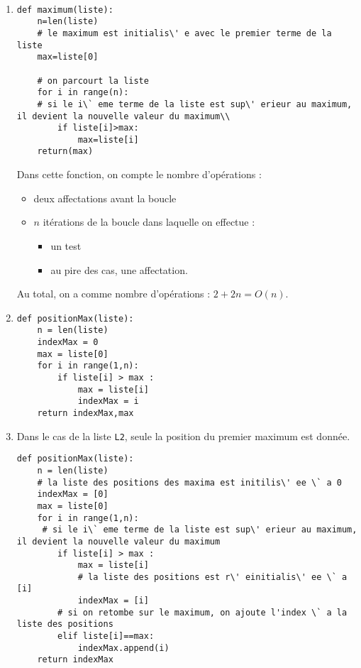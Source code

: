 \begin{solution}~\\
\vspace{-0.7cm}
\begin{enumerate}
\item 
\begin{verbatim}
def maximum(liste):
    n=len(liste)
    # le maximum est initialis\' e avec le premier terme de la liste
    max=liste[0]
    
    # on parcourt la liste
    for i in range(n):
    # si le i\` eme terme de la liste est sup\' erieur au maximum, il devient la nouvelle valeur du maximum\\
        if liste[i]>max:
            max=liste[i]
    return(max)                    
\end{verbatim}


Dans cette fonction, on compte le nombre d'op\' erations :

\begin{itemize}
\item deux affectations avant la boucle
\item $n$ it\' erations de la boucle dans laquelle on effectue :
\begin{itemize}
\item un test
\item au pire des cas, une affectation.
\end{itemize}
\end{itemize}
Au total, on a comme nombre d'op\' erations : $2+2n=O(n)$.\\
\item 
\begin{verbatim}
def positionMax(liste):
    n = len(liste)
    indexMax = 0
    max = liste[0]
    for i in range(1,n):
        if liste[i] > max :
            max = liste[i]
            indexMax = i
    return indexMax,max                  
\end{verbatim}

\item Dans le cas de la liste \verb?L2?, seule la position du premier maximum est donn\' ee.\\
\begin{verbatim}
def positionMax(liste):
    n = len(liste)
    # la liste des positions des maxima est initilis\' ee \` a 0
    indexMax = [0]
    max = liste[0]
    for i in range(1,n):
     # si le i\` eme terme de la liste est sup\' erieur au maximum, il devient la nouvelle valeur du maximum
        if liste[i] > max :
            max = liste[i]
            # la liste des positions est r\' einitialis\' ee \` a [i]
            indexMax = [i]
        # si on retombe sur le maximum, on ajoute l'index \` a la liste des positions
        elif liste[i]==max:
            indexMax.append(i)	
    return indexMax                 
\end{verbatim}
\end{enumerate}
\end{solution}



